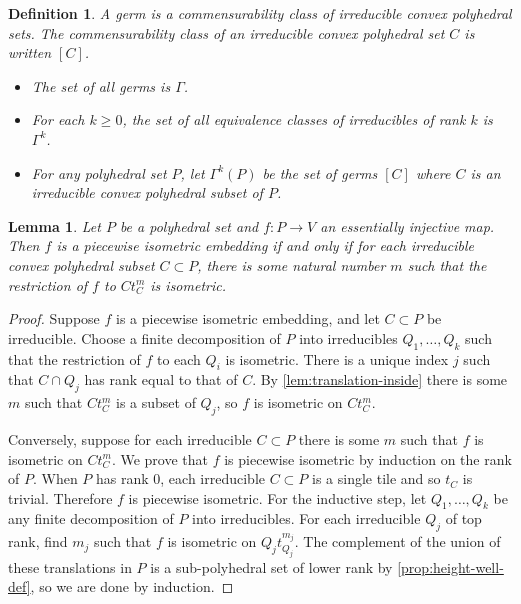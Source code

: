 \documentclass[11pt]{amsart}
\newtheorem{lemma}[theorem]{Lemma}
\newtheorem{definition}[theorem]{Definition}
\numberwithin{table}{section}
\numberwithin{figure}{section}
\theoremstyle{remark}
\begin{document}
\begin{definition}
  A {\em germ} is a commensurability class of irreducible convex
  polyhedral sets. The commensurability class of an irreducible convex
  polyhedral set $C$ is written $[C]$.
  \begin{itemize}
    \item The set of all germs is $\Gamma$.
    \item For each $k\geq 0$, the set of all equivalence classes of
      irreducibles of rank $k$ is $\Gamma^k$.
    \item For any polyhedral set $P$,
      let $\Gamma^k(P)$ be the set of germs $[C]$ where $C$ is an
      irreducible convex polyhedral subset of $P$.
      \end{itemize}
\end{definition}




\begin{lemma} \label{lem:pi-alcove-characterization} Let $P$ be a
  polyhedral set and $f:P\to V$ an essentially injective map. Then $f$
  is a piecewise isometric embedding if and only if for each
  irreducible convex polyhedral subset $C\subset P$, there is some
  natural number $m$ such that the restriction of $f$ to $C t_C^m$ is
  isometric.
\end{lemma}
\begin{proof}
  Suppose $f$ is a piecewise isometric embedding, and let $C\subset P$
  be irreducible. Choose a finite decomposition of $P$ into
  irreducibles $Q_1,\dotsc, Q_k$ such that the restriction of $f$ to
  each $Q_i$ is isometric. There is a unique index $j$ such that
  $C\cap Q_j$ has rank equal to that of $C$. By
  \cref{lem:translation-inside} there is some $m$ such that $C t_C^m$
  is a subset of $Q_j$, so $f$ is isometric on $C t_C^m$.

  Conversely, suppose for each irreducible $C\subset P$ there is some
  $m$ such that $f$ is isometric on $C t_C^m$. We prove that $f$ is
  piecewise isometric by induction on the rank of $P$. When $P$ has
  rank $0$, each irreducible $C\subset P$ is a single tile and so
  $t_C$ is trivial. Therefore $f$ is piecewise isometric. For the
  inductive step, let $Q_1,\dotsc, Q_k$ be any finite decomposition of
  $P$ into irreducibles. For each irreducible $Q_j$ of top rank, find
  $m_j$ such that $f$ is isometric on $Q_j t_{Q_j}^{m_j}$. The
  complement of the union of these translations in $P$ is a
  sub-polyhedral set of lower rank by \cref{prop:height-well-def}, so
  we are done by induction.
\end{proof}
\end{document}
